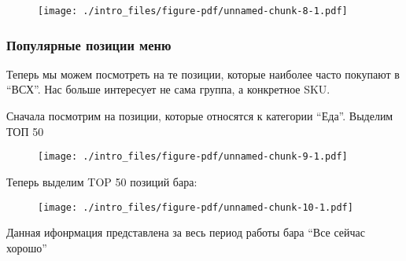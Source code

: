 \documentclass[
  letterpaper,
  DIV=11,
  numbers=noendperiod]{scrreport}
\begin{document}
\begin{figure}

{\centering \texttt{[image: ./intro\_files/figure-pdf/unnamed-chunk-8-1.pdf]}

}

\end{figure}

\hypertarget{ux43fux43eux43fux443ux43bux44fux440ux43dux44bux435-ux43fux43eux437ux438ux446ux438ux438-ux43cux435ux43dux44e}{%
\subsubsection*{Популярные позиции
меню}\label{ux43fux43eux43fux443ux43bux44fux440ux43dux44bux435-ux43fux43eux437ux438ux446ux438ux438-ux43cux435ux43dux44e}}

Теперь мы можем посмотреть на те позиции, которые наиболее часто
покупают в ``ВСХ''. Нас больше интересует не сама группа, а конкретное
SKU.

Сначала посмотрим на позиции, которые относятся к категории ``Еда''.
Выделим ТОП 50

\begin{figure}

{\centering \texttt{[image: ./intro\_files/figure-pdf/unnamed-chunk-9-1.pdf]}

}

\end{figure}

Теперь выделим TOP 50 позиций бара:

\begin{figure}

{\centering \texttt{[image: ./intro\_files/figure-pdf/unnamed-chunk-10-1.pdf]}

}

\end{figure}

\begin{tcolorbox}[enhanced jigsaw, colframe=quarto-callout-caution-color-frame, leftrule=.75mm, colback=white, arc=.35mm, toprule=.15mm, opacityback=0, bottomrule=.15mm, breakable, left=2mm, rightrule=.15mm]
\begin{minipage}[t]{5.5mm}
\textcolor{quarto-callout-caution-color}{\faFire}
\end{minipage}%
\begin{minipage}[t]{\textwidth - 5.5mm}
Данная ифонрмация представлена за весь период работы бара ``Все сейчас
хорошо''\end{minipage}%
\end{tcolorbox}
\end{document}
